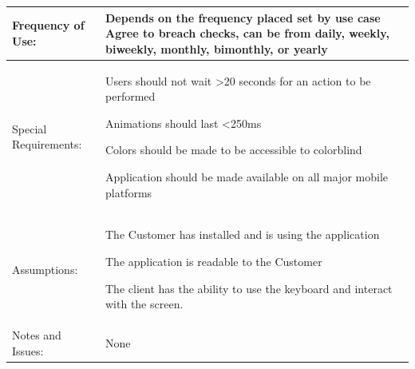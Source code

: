 \documentclass[stu]{apa7}
\newcommand{\nextitem}{\par\hspace*{\labelsep}\textbullet\hspace*{\labelsep}}
\begin{document}
{\begin{xltabular}{\textwidth}{|l|X|}
  Frequency of Use: & Depends on the frequency placed set by use case Agree to breach checks, can be from daily, weekly, biweekly, monthly, bimonthly, or yearly \\ \hline

  Special Requirements: & \nextitem Users should not wait >20 seconds for an action to be performed
                          \nextitem Animations should last <250ms
                          \nextitem Colors should be made to be accessible to colorblind
                          \nextitem Application should be made available on all major mobile platforms \\ \hline
              Assumptions: &
                             \nextitem The Customer has installed and is using the application
                             \nextitem The application is readable to the Customer
                             \nextitem The client has the ability to use the keyboard and interact with the screen. \\ \hline

  Notes and Issues: & None \\ \hline

\end{xltabular}}
\end{document}
